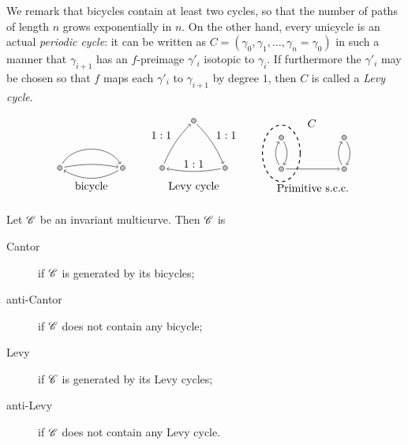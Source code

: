 \documentclass{amsart}
\begin{document}
We remark that bicycles contain at least two cycles, so that the
number of paths of length $n$ grows exponentially in $n$. On the other
hand, every unicycle is an actual \emph{periodic cycle}: it can be
written as $C=(\gamma_0,\gamma_1,\dots,\gamma_n=\gamma_0)$ in such a
manner that $\gamma_{i+1}$ has an $f$-preimage $\gamma'_i$ isotopic to
$\gamma_i$. If furthermore the $\gamma'_i$ may be chosen so that $f$
maps each $\gamma'_i$ to $\gamma_{i+1}$ by degree $1$, then $C$ is
called a \emph{Levy cycle}.

\[\begin{tikzpicture}[->,auto,vx/.style={circle,minimum size=1ex,inner sep=0pt,outer sep=2pt,draw,fill=gray!50}]
  \node[vx] (1) at (-1,0) {};
  \node[vx] (2) at (1,0) {};
  \draw (1)  to [bend left=60] (2);
  \draw (1)  to [bend left=10] (2);
  \draw (2)  to [bend left] (1);
  \node at (0,-0.6) {bicycle};
\end{tikzpicture}
\qquad
\begin{tikzpicture}[->,auto,vx/.style={circle,minimum size=1ex,inner sep=0pt,outer sep=2pt,draw,fill=gray!50}]
  \node[vx] (1) at (-1,0) {};
  \node[vx] (2) at (0,1.5) {};
  \node[vx] (3) at (1,0) {};
  \draw (1)  to [bend left=10] node {$1:1$} (2);
  \draw (2)  to [bend left=10] node {$1:1$} (3);
  \draw (3)  to [bend left=10] node [above] {$1:1$} (1);
  \node at (0,-0.6) {Levy cycle};
\end{tikzpicture}
\qquad
\begin{tikzpicture}[->,auto,vx/.style={circle,minimum size=1ex,inner sep=0pt,outer sep=2pt,draw,fill=gray!50}]
  \node[vx] (1) at (-1,0) {};
  \node[vx] (2) at (-1,1) {};
  \node[vx] (3) at (1,0) {};
  \node[vx] (4) at (1,1) {};
  \draw[dashed,thick] (-1,0.5) ellipse (6mm and 9mm) node[above right=7mm] {$C$};
  \draw (1)  to [bend left] (2);
  \draw (2)  to [bend left] (1);
  \draw (1)  to (3);
  \draw (3)  to [bend left] (4);
  \draw (4)  to [bend left] (3);
  \node at (0,-0.6) {Primitive s.c.c.};
\end{tikzpicture}
\]

\begin{defn}
  Let ${\mathscr C}$ be an invariant multicurve. Then ${\mathscr C}$ is
  \renewcommand{\descriptionlabel}[1]{\hspace{\labelsep}\textbf{\emph{#1}}}
  \begin{description}
  \item[Cantor] if ${\mathscr C}$ is generated by its bicycles;
  \item[anti-Cantor] if ${\mathscr C}$ does not contain any bicycle;
  \item[Levy] if ${\mathscr C}$ is generated by its Levy cycles;
  \item[anti-Levy] if ${\mathscr C}$ does not contain any Levy cycle.\qedhere
  \end{description}
\end{defn}
\end{document}
